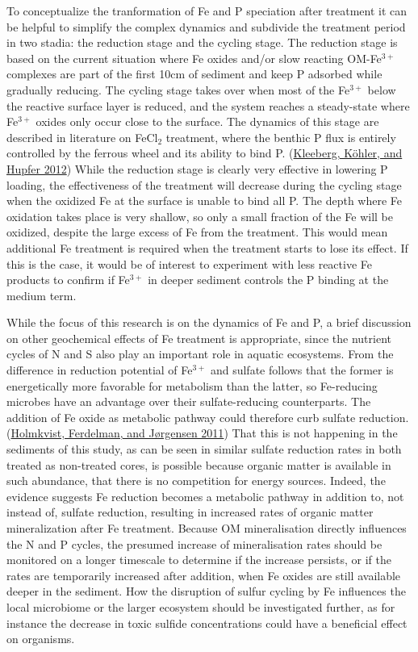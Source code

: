 \documentclass[a4paper,11pt]{article}
\begin{document}
To conceptualize the tranformation of Fe and P speciation after treatment it can be helpful to simplify the complex dynamics and subdivide the treatment period in two stadia: the reduction stage and the cycling stage. The reduction stage is based on the current situation where Fe oxides and/or slow reacting OM-Fe\(^{3+}\) complexes are part of the first 10cm of sediment and keep P adsorbed while gradually reducing. The cycling stage takes over when most of the Fe\(^{3+}\) below the reactive surface layer is reduced, and the system reaches a steady-state where Fe\(^{3+}\) oxides only occur close to the surface. The dynamics of this stage are described in literature on FeCl\(_2\) treatment, where the benthic P flux is entirely controlled by the ferrous wheel and its ability to bind P. (\protect\hyperlink{ref-kleebergHowEffectivelyDoes2012}{Kleeberg, Köhler, and Hupfer 2012}) While the reduction stage is clearly very effective in lowering P loading, the effectiveness of the treatment will decrease during the cycling stage when the oxidized Fe at the surface is unable to bind all P. The depth where Fe oxidation takes place is very shallow, so only a small fraction of the Fe will be oxidized, despite the large excess of Fe from the treatment. This would mean additional Fe treatment is required when the treatment starts to lose its effect. If this is the case, it would be of interest to experiment with less reactive Fe products to confirm if Fe\(^{3+}\) in deeper sediment controls the P binding at the medium term.

While the focus of this research is on the dynamics of Fe and P, a brief discussion on other geochemical effects of Fe treatment is appropriate, since the nutrient cycles of N and S also play an important role in aquatic ecosystems. From the difference in reduction potential of Fe\(^{3+}\) and sulfate follows that the former is energetically more favorable for metabolism than the latter, so Fe-reducing microbes have an advantage over their sulfate-reducing counterparts. The addition of Fe oxide as metabolic pathway could therefore curb sulfate reduction. (\protect\hyperlink{ref-holmkvistHolmkvistFerdelmanTG2011}{Holmkvist, Ferdelman, and Jørgensen 2011}) That this is not happening in the sediments of this study, as can be seen in similar sulfate reduction rates in both treated as non-treated cores, is possible because organic matter is available in such abundance, that there is no competition for energy sources. Indeed, the evidence suggests Fe reduction becomes a metabolic pathway in addition to, not instead of, sulfate reduction, resulting in increased rates of organic matter mineralization after Fe treatment. Because OM mineralisation directly influences the N and P cycles, the presumed increase of mineralisation rates should be monitored on a longer timescale to determine if the increase persists, or if the rates are temporarily increased after addition, when Fe oxides are still available deeper in the sediment. How the disruption of sulfur cycling by Fe influences the local microbiome or the larger ecosystem should be investigated further, as for instance the decrease in toxic sulfide concentrations could have a beneficial effect on organisms.
\end{document}
